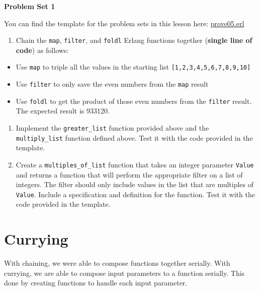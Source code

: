 \documentclass[
]{book}
\providecommand{\tightlist}{%
  \setlength{\itemsep}{0pt}\setlength{\parskip}{0pt}}
\begin{document}
\begin{problembox}

\textbf{Problem Set 1}

You can find the template for the problem sets in this lesson here: \href{proves/prove05.erl}{prove05.erl}

\begin{enumerate}
\def\labelenumi{\arabic{enumi}.}
\tightlist
\item
  Chain the \texttt{map}, \texttt{filter}, and \texttt{foldl} Erlang functions together (\textbf{single line of code}) as follows:
\end{enumerate}

\begin{itemize}
\tightlist
\item
  Use \texttt{map} to triple all the values in the starting list \texttt{{[}1,2,3,4,5,6,7,8,9,10{]}}
\item
  Use \texttt{filter} to only save the even numbers from the \texttt{map} result
\item
  Use \texttt{foldl} to get the product of those even numbers from the \texttt{filter} result. The expected result is 933120.
\end{itemize}

\begin{enumerate}
\def\labelenumi{\arabic{enumi}.}
\setcounter{enumi}{1}
\tightlist
\item
  Implement the \texttt{greater\_list} function provided above and the \texttt{multiply\_list} function defined above. Test it with the code provided in the template.
\item
  Create a \texttt{multiples\_of\_list} function that takes an integer parameter \texttt{Value} and returns a function that will perform the appropriate filter on a list of integers. The filter should only include values in the list that are multiples of \texttt{Value}. Include a specification and definition for the function. Test it with the code provided in the template.
\end{enumerate}

\end{problembox}

\hypertarget{currying}{%
\section{Currying}\label{currying}}

With chaining, we were able to compose functions together serially. With currying, we are able to compose input parameters to a function serially. This done by creating functions to handle each input parameter.
\end{document}
